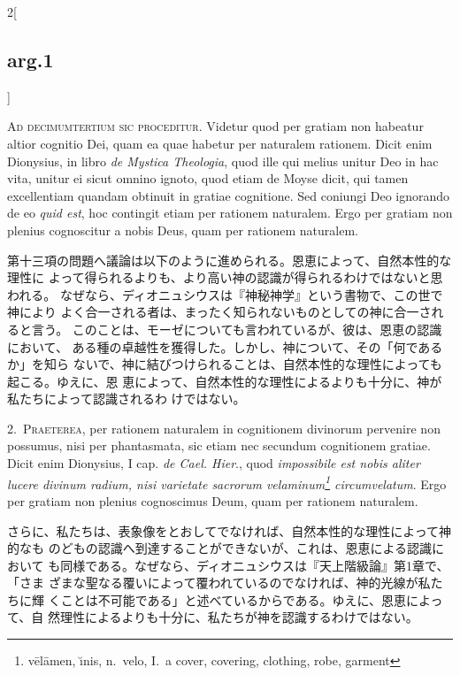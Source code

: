 \documentclass[paper=a4paper,fontsize=10pt,jafontsize=9pt,titlepage]{jlreq}
\begin{document}
\begin{paracol}{2}[\subsection{arg.1}]

{\scshape Ad decimumtertium sic proceditur}. Videtur quod per gratiam non
habeatur altior cognitio Dei, quam ea quae habetur per naturalem
rationem. Dicit enim Dionysius, in libro {\itshape de Mystica Theologia},
quod ille qui melius unitur Deo in hac vita, unitur ei sicut omnino
ignoto, quod etiam de Moyse dicit, qui tamen excellentiam quandam
obtinuit in gratiae cognitione. Sed coniungi Deo ignorando de eo {\itshape
quid est}, hoc contingit etiam per rationem naturalem. Ergo per
gratiam non plenius cognoscitur a nobis Deus, quam per rationem
naturalem.

\switchcolumn

第十三項の問題へ議論は以下のように進められる。恩恵によって、自然本性的な理性に
よって得られるよりも、より高い神の認識が得られるわけではないと思われる。
なぜなら、ディオニュシウスは『神秘神学』という書物で、この世で神により
よく合一される者は、まったく知られないものとしての神に合一されると言う。
このことは、モーゼについても言われているが、彼は、恩恵の認識において、
ある種の卓越性を獲得した。しかし、神について、その「何であるか」を知ら
ないで、神に結びつけられることは、自然本性的な理性によっても起こる。ゆえに、恩
恵によって、自然本性的な理性によるよりも十分に、神が私たちによって認識されるわ
けではない。


2.~{\scshape Praeterea}, per rationem naturalem in cognitionem divinorum
pervenire non possumus, nisi per phantasmata, sic etiam nec secundum
cognitionem gratiae. Dicit enim Dionysius, I cap. {\itshape de
Cael. Hier}., quod {\itshape impossibile est nobis aliter lucere divinum
radium, nisi varietate sacrorum velaminum\footnote{v\={e}l\={a}men,
\u{\i}nis, n.\ velo, I.~a cover, covering, clothing, robe, garment}
circumvelatum}. Ergo per gratiam non plenius cognoscimus Deum, quam
per rationem naturalem.

\switchcolumn

さらに、私たちは、表象像をとおしてでなければ、自然本性的な理性によって神的なも
のどもの認識へ到達することができないが、これは、恩恵による認識において
も同様である。なぜなら、ディオニュシウスは『天上階級論』第1章で、「さま
ざまな聖なる覆いによって覆われているのでなければ、神的光線が私たちに輝
くことは不可能である」と述べているからである。ゆえに、恩恵によって、自
然理性によるよりも十分に、私たちが神を認識するわけではない。


\end{paracol}
\end{document}

